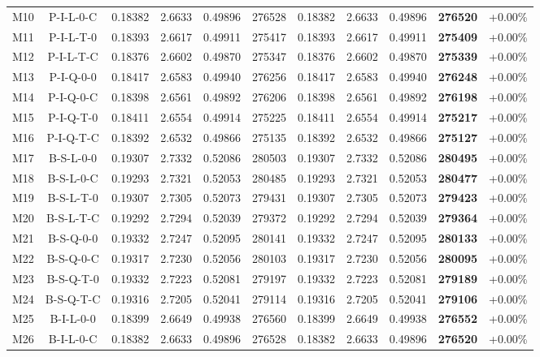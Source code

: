 \begin{table}[t]
\begin{tabular}{cc | cccc | cccc | c}
M10 & P-I-L-0-C & 0.18382 & 2.6633 & 0.49896 & 276528 & 0.18382 & 2.6633 & 0.49896 & \textbf{276520} & +0.00\% \\
M11 & P-I-L-T-0 & 0.18393 & 2.6617 & 0.49911 & 275417 & 0.18393 & 2.6617 & 0.49911 & \textbf{275409} & +0.00\% \\
M12 & P-I-L-T-C & 0.18376 & 2.6602 & 0.49870 & 275347 & 0.18376 & 2.6602 & 0.49870 & \textbf{275339} & +0.00\% \\
M13 & P-I-Q-0-0 & 0.18417 & 2.6583 & 0.49940 & 276256 & 0.18417 & 2.6583 & 0.49940 & \textbf{276248} & +0.00\% \\
M14 & P-I-Q-0-C & 0.18398 & 2.6561 & 0.49892 & 276206 & 0.18398 & 2.6561 & 0.49892 & \textbf{276198} & +0.00\% \\
M15 & P-I-Q-T-0 & 0.18411 & 2.6554 & 0.49914 & 275225 & 0.18411 & 2.6554 & 0.49914 & \textbf{275217} & +0.00\% \\
M16 & P-I-Q-T-C & 0.18392 & 2.6532 & 0.49866 & 275135 & 0.18392 & 2.6532 & 0.49866 & \textbf{275127} & +0.00\% \\
M17 & B-S-L-0-0 & 0.19307 & 2.7332 & 0.52086 & 280503 & 0.19307 & 2.7332 & 0.52086 & \textbf{280495} & +0.00\% \\
M18 & B-S-L-0-C & 0.19293 & 2.7321 & 0.52053 & 280485 & 0.19293 & 2.7321 & 0.52053 & \textbf{280477} & +0.00\% \\
M19 & B-S-L-T-0 & 0.19307 & 2.7305 & 0.52073 & 279431 & 0.19307 & 2.7305 & 0.52073 & \textbf{279423} & +0.00\% \\
M20 & B-S-L-T-C & 0.19292 & 2.7294 & 0.52039 & 279372 & 0.19292 & 2.7294 & 0.52039 & \textbf{279364} & +0.00\% \\
M21 & B-S-Q-0-0 & 0.19332 & 2.7247 & 0.52095 & 280141 & 0.19332 & 2.7247 & 0.52095 & \textbf{280133} & +0.00\% \\
M22 & B-S-Q-0-C & 0.19317 & 2.7230 & 0.52056 & 280103 & 0.19317 & 2.7230 & 0.52056 & \textbf{280095} & +0.00\% \\
M23 & B-S-Q-T-0 & 0.19332 & 2.7223 & 0.52081 & 279197 & 0.19332 & 2.7223 & 0.52081 & \textbf{279189} & +0.00\% \\
M24 & B-S-Q-T-C & 0.19316 & 2.7205 & 0.52041 & 279114 & 0.19316 & 2.7205 & 0.52041 & \textbf{279106} & +0.00\% \\
M25 & B-I-L-0-0 & 0.18399 & 2.6649 & 0.49938 & 276560 & 0.18399 & 2.6649 & 0.49938 & \textbf{276552} & +0.00\% \\
M26 & B-I-L-0-C & 0.18382 & 2.6633 & 0.49896 & 276528 & 0.18382 & 2.6633 & 0.49896 & \textbf{276520} & +0.00\% \\

\end{tabular}
\end{table}
